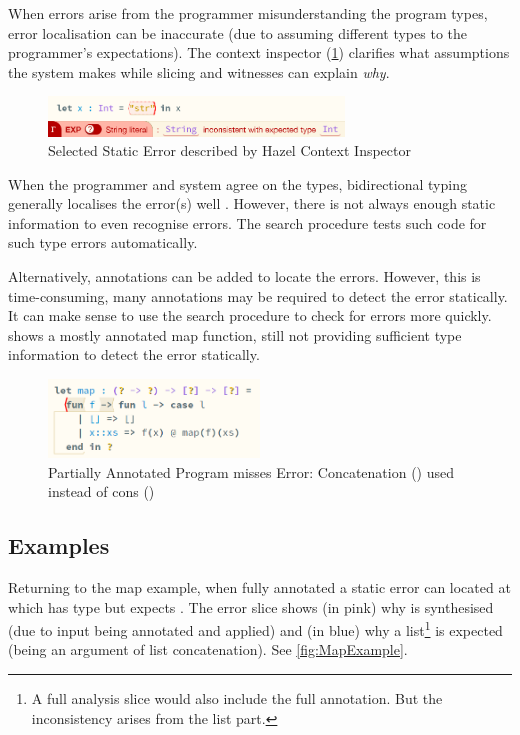 When errors arise from the programmer misunderstanding the program types, error localisation can be inaccurate (due to assuming different types to the programmer's expectations). The context inspector (\cref{fig:ContextInspector}) clarifies what assumptions the system makes while slicing and witnesses can explain \textit{why}.

\begin{figure}[h]\centering
\includegraphics[width=0.7\textwidth]{Media/Figures/context_inspector}
\caption{Selected Static Error described by Hazel Context Inspector}
\label{fig:ContextInspector}
\end{figure}

When the programmer and system agree on the types, bidirectional typing generally localises the error(s) well \cite{BidirectionalTypes, MarkedLocalisation}. However, there is not always enough static information to even recognise errors. The search procedure tests such code for such type errors automatically. 

Alternatively, annotations can be added to locate the errors. However, this is time-consuming, many annotations may be required to detect the error statically. It can make sense to use the search procedure to check for errors more quickly.  shows a mostly annotated map function, still not providing sufficient type information to detect the error statically.


\begin{figure}[H]
\centering
\includegraphics[width=0.5\textwidth]{Media/Figures/partial_annotations}
\caption{Partially Annotated Program misses Error: Concatenation () used instead of cons (\code{::})}
\label{fig:HalfAnnotated}
\end{figure}

\subsection{Examples}
\label{sec:EvalExamples}
Returning to the map example, when fully annotated a static error can located at  which has type  but expects \code{[Int]}. The error slice shows (in pink) why  is synthesised (due to input  being annotated  and applied) and (in blue) why a list\footnote{A full analysis slice would also include the full \code{[Int]} annotation. But the inconsistency arises from the list part.} is expected (being an argument of list concatenation). See \cref{fig:MapExample}.

